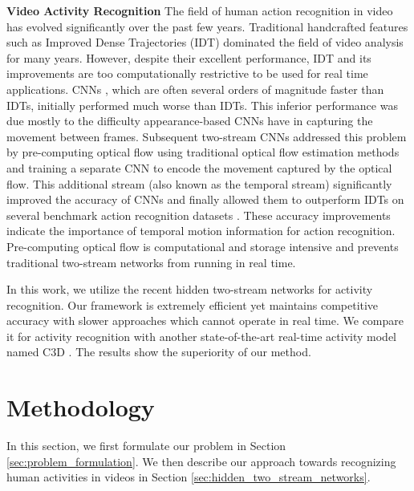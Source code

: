 \documentclass[sigconf]{acmart}
\begin{document}
	\noindent \textbf{Video Activity Recognition}
	The field of human action recognition in video has evolved significantly over the past few years. Traditional handcrafted features such as Improved Dense Trajectories (IDT) \cite{idtfWang2013} dominated the field of video analysis for many years. However, despite their excellent performance, IDT and its improvements \cite{peng2014action,MIFS2015,dovf_lan_2017} are too computationally restrictive to be used for real time applications. CNNs \cite{KarpathyCVPR14,c3d2015}, which are often several orders of magnitude faster than IDTs, initially performed much worse than IDTs. This inferior performance was due mostly to the difficulty appearance-based CNNs have in capturing the movement between frames. Subsequent two-stream CNNs \cite{twostream2014, wanggoodpractice2015} addressed this problem by pre-computing optical flow using traditional optical flow estimation methods \cite{tvl1realTime} and training a separate CNN to encode the movement captured by the optical flow. This additional stream (also known as the temporal stream) significantly improved the accuracy of CNNs and finally allowed them to outperform IDTs on several benchmark action recognition datasets \cite{wanggoodpractice2015,convTwoStream2016,depth2action,TSN2016,res_two_stream_nips16,diba_tle_2016}. These accuracy improvements indicate the importance of temporal motion information for action recognition. Pre-computing optical flow is computational and storage intensive and prevents traditional two-stream networks from running in real time.
	
	In this work, we utilize the recent hidden two-stream networks \cite{hidden_zhu_17} for activity recognition. Our framework is extremely efficient yet maintains competitive accuracy with slower approaches which cannot operate in real time. We compare it for activity recognition with another state-of-the-art real-time activity model named C3D \cite{c3d2015}. The results show the superiority of our method. 
	
	\section{Methodology}
	\label{sec:methodology}
	In this section, we first formulate our problem in Section \ref{sec:problem_formulation}. We then describe our approach towards recognizing human activities in videos in Section \ref{sec:hidden_two_stream_networks}. 
	
\end{document}
